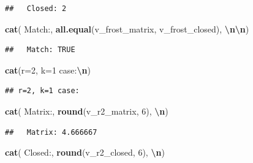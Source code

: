 \documentclass[
  11pt,
]{article}
\newenvironment{Shaded}{\begin{snugshade}}{\end{snugshade}}
\newcommand{\DecValTok}[1]{\textcolor[rgb]{0.00,0.00,0.81}{#1}}
\newcommand{\FunctionTok}[1]{\textcolor[rgb]{0.13,0.29,0.53}{\textbf{#1}}}
\newcommand{\NormalTok}[1]{#1}
\newcommand{\SpecialCharTok}[1]{\textcolor[rgb]{0.81,0.36,0.00}{\textbf{#1}}}
\newcommand{\StringTok}[1]{\textcolor[rgb]{0.31,0.60,0.02}{#1}}
\begin{document}
\begin{verbatim}
##   Closed: 2
\end{verbatim}

\begin{Shaded}
\begin{Highlighting}[]
\FunctionTok{cat}\NormalTok{(}\StringTok{\textquotesingle{}  Match:\textquotesingle{}}\NormalTok{,}
    \FunctionTok{all.equal}\NormalTok{(v\_frost\_matrix, v\_frost\_closed), }\StringTok{\textquotesingle{}}\SpecialCharTok{\textbackslash{}n\textbackslash{}n}\StringTok{\textquotesingle{}}\NormalTok{)}
\end{Highlighting}
\end{Shaded}

\begin{verbatim}
##   Match: TRUE
\end{verbatim}

\begin{Shaded}
\begin{Highlighting}[]
\FunctionTok{cat}\NormalTok{(}\StringTok{\textquotesingle{}r=2, k=1 case:}\SpecialCharTok{\textbackslash{}n}\StringTok{\textquotesingle{}}\NormalTok{)}
\end{Highlighting}
\end{Shaded}

\begin{verbatim}
## r=2, k=1 case:
\end{verbatim}

\begin{Shaded}
\begin{Highlighting}[]
\FunctionTok{cat}\NormalTok{(}\StringTok{\textquotesingle{}  Matrix:\textquotesingle{}}\NormalTok{, }\FunctionTok{round}\NormalTok{(v\_r2\_matrix, }\DecValTok{6}\NormalTok{), }\StringTok{\textquotesingle{}}\SpecialCharTok{\textbackslash{}n}\StringTok{\textquotesingle{}}\NormalTok{)}
\end{Highlighting}
\end{Shaded}

\begin{verbatim}
##   Matrix: 4.666667
\end{verbatim}

\begin{Shaded}
\begin{Highlighting}[]
\FunctionTok{cat}\NormalTok{(}\StringTok{\textquotesingle{}  Closed:\textquotesingle{}}\NormalTok{, }\FunctionTok{round}\NormalTok{(v\_r2\_closed, }\DecValTok{6}\NormalTok{), }\StringTok{\textquotesingle{}}\SpecialCharTok{\textbackslash{}n}\StringTok{\textquotesingle{}}\NormalTok{)}
\end{Highlighting}
\end{Shaded}
\end{document}
